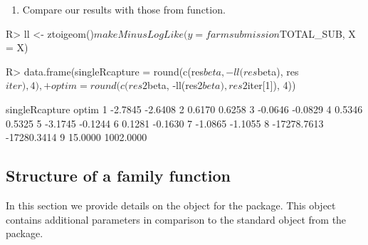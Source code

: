 \documentclass[
]{jss}
\providecommand{\tightlist}{%
  \setlength{\itemsep}{0pt}\setlength{\parskip}{0pt}}
\newcommand{\1}{\mathcal{I}} \newcommand{\bZero}{\boldsymbol{0}}
\begin{document}
\begin{enumerate}
\def\labelenumi{\arabic{enumi}.}
\setcounter{enumi}{4}
\tightlist
\item
  Compare our results with those from  function.
\end{enumerate}

\begin{CodeChunk}
\begin{CodeInput}
R> ll <- ztoigeom()$makeMinusLogLike(y = farmsubmission$TOTAL_SUB, X = X)
\end{CodeInput}
\end{CodeChunk}

\begin{CodeChunk}
\end{CodeChunk}

\begin{CodeChunk}
\begin{CodeInput}
R> data.frame(singleRcapture = round(c(res$beta, -ll(res$beta), res$iter), 4),
+            optim = round(c(res2$beta, -ll(res2$beta), res2$iter[1]), 4))
\end{CodeInput}
\begin{CodeOutput}
  singleRcapture       optim
1        -2.7845     -2.6408
2         0.6170      0.6258
3        -0.0646     -0.0829
4         0.5346      0.5325
5        -3.1745     -0.1244
6         0.1281     -0.1630
7        -1.0865     -1.1055
8    -17278.7613 -17280.3414
9        15.0000   1002.0000
\end{CodeOutput}
\end{CodeChunk}

\clearpage

\subsection{Structure of a family function}\label{sec-family}

In this section we provide details on the  object for the
 package. This object contains additional parameters
in comparison to the standard  object from the 
package.
\end{document}
